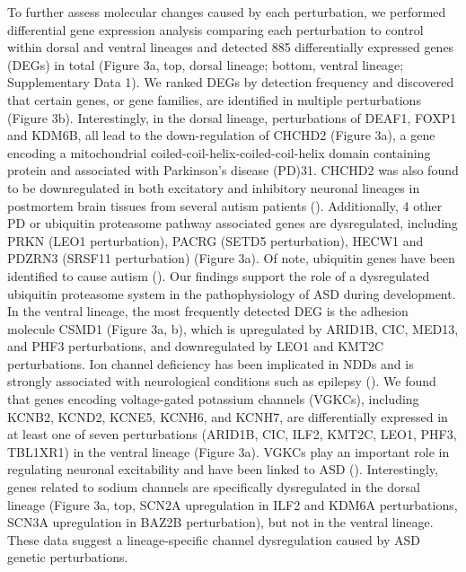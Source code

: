 To further assess molecular changes caused by each perturbation, we performed differential gene expression analysis comparing each perturbation to control within dorsal and ventral lineages and detected 885 differentially expressed genes (DEGs) in total (Figure 3a, top, dorsal lineage; bottom, ventral lineage; Supplementary Data 1). We ranked DEGs by detection frequency and discovered that certain genes, or gene families, are identified in multiple perturbations (Figure 3b). Interestingly, in the dorsal lineage, perturbations of DEAF1, FOXP1 and KDM6B, all lead to the down-regulation of CHCHD2 (Figure 3a), a gene encoding a mitochondrial coiled-coil-helix-coiled-coil-helix domain containing protein and associated with Parkinson's disease (PD)31. CHCHD2 was also found to be downregulated in both excitatory and inhibitory neuronal lineages in postmortem brain tissues from several autism patients (\cite{velmeshev_single-cell_2019}). Additionally, 4 other PD or ubiquitin proteasome pathway associated genes are dysregulated, including PRKN (LEO1 perturbation), PACRG (SETD5 perturbation), HECW1 and PDZRN3 (SRSF11 perturbation) (Figure 3a). Of note, ubiquitin genes have been identified to cause autism (\cite{glessner_autism_2009}). Our findings support the role of a dysregulated ubiquitin proteasome system in the pathophysiology of ASD during development. In the ventral lineage, the most frequently detected DEG is the adhesion molecule CSMD1 (Figure 3a, b), which is upregulated by ARID1B, CIC, MED13, and PHF3 perturbations, and downregulated by LEO1 and KMT2C perturbations.
Ion channel deficiency has been implicated in NDDs and is strongly associated with neurological conditions such as epilepsy (\cite{consortium_novo_2018}). We found that genes encoding voltage-gated potassium channels (VGKCs), including KCNB2, KCND2, KCNE5, KCNH6, and KCNH7, are differentially expressed in at least one of seven perturbations (ARID1B, CIC, ILF2, KMT2C, LEO1, PHF3, TBL1XR1) in the ventral lineage (Figure 3a). VGKCs play an important role in regulating neuronal excitability and have been linked to ASD (\cite{lee_exome_2014}). Interestingly, genes related to sodium channels are specifically dysregulated in the dorsal lineage (Figure 3a, top, SCN2A upregulation in ILF2 and KDM6A perturbations, SCN3A upregulation in BAZ2B perturbation), but not in the ventral lineage. These data suggest a lineage-specific channel dysregulation caused by ASD genetic perturbations. 


